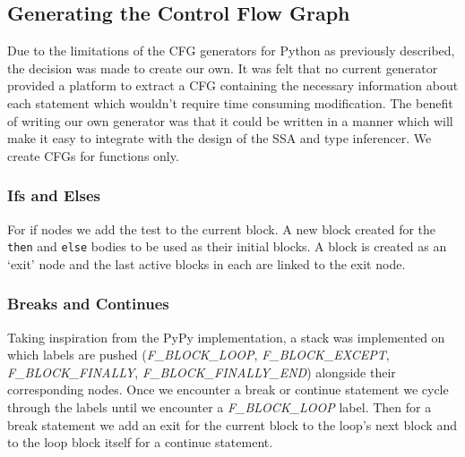 \documentclass[12pt, titlepage]{article}
\begin{document}
\subsection{Generating the Control Flow Graph}
Due to the limitations of the CFG generators for Python as previously described, the decision was made to create our own. It was felt that no current generator provided a platform to extract a CFG containing the necessary information about each statement which wouldn't require time consuming modification. The benefit of writing our own generator was that it could be written in a manner which will make it easy to integrate with the design of the SSA and type inferencer. We create CFGs for functions only.

\subsubsection{Ifs and Elses}
For if nodes we add the test to the current block. A new block created for the \texttt{then} and \texttt{else} bodies to be used as their initial blocks. A block is created as an `exit' node and the last active blocks in each are linked to the exit node.


\subsubsection{Breaks and Continues} 
Taking inspiration from the PyPy implementation, a stack was implemented on which labels are pushed (\textit{F\_BLOCK\_LOOP}, \textit{F\_BLOCK\_EXCEPT}, \textit{F\_BLOCK\_FINALLY}, \textit{F\_BLOCK\_FINALLY\_END}) alongside their corresponding nodes. Once we encounter a break or continue statement we cycle through the labels until we encounter a \textit{F\_BLOCK\_LOOP} label. Then for a break statement we add an exit for the current block to the loop's next block and to the loop block itself for a continue statement.
\end{document}
